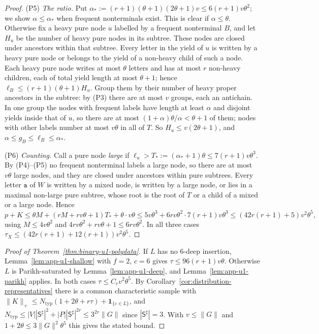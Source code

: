 \documentclass[11pt]{article}
\numberwithin{equation}{section}
\theoremstyle{plain}
\theoremstyle{definition}
\theoremstyle{remark}
\newcommand{\eps}{\varepsilon}
\theoremstyle{plain}
\begin{document}
\begin{proof}
(P5) \emph{The ratio.}  Put $\alpha_*:=(r+1)(\theta+1)(2\theta+1)v\le6(r+1)v\theta^2$;
we show $\alpha\le\alpha_*$ when frequent nonterminals exist.  This is clear if
$\alpha\le\theta$.  Otherwise fix a heavy pure node $u$ labelled by a
frequent nonterminal $B$, and let $H_u$ be the number of heavy pure nodes in
its subtree.  These nodes are closed under ancestors within that subtree.
Every letter in the yield of $u$ is written by a heavy pure node or belongs
to the yield of a non-heavy child of such a node.  Each heavy pure node writes
at most $\theta$ letters and has at most $r$ non-heavy children, each of total
yield length at most $\theta+1$; hence
$\ell_B\le(r+1)(\theta+1)H_u$.  Group them by their number of heavy proper
ancestors in the subtree: by (P3) there are at most $v$ groups, each an
antichain.  In one group the nodes with frequent labels have length at least
$\alpha$ and disjoint yields inside that of $u$, so there are at most
$(1+\alpha)\theta/\alpha<\theta+1$ of them; nodes with other labels number at
most $v\theta$ in all of $T$.  So $H_u\le v(2\theta+1)$, and
$\alpha\le g_B\le\ell_B\le\alpha_*$.

(P6) \emph{Counting.}  Call a pure node \emph{large} if $\ell_u>T_*:=(\alpha_*+1)\theta
\le7(r+1)v\theta^3$.  By (P4)--(P5) no frequent nonterminal labels a large node,
so there are at most $v\theta$ large nodes, and they are closed under ancestors
within pure subtrees.  Every letter $\mathtt a$ of $W$ is written by a mixed node, is
written by a large node, or lies in a maximal non-large pure subtree, whose root
is the root of $T$ or a child of a mixed or a large node.  Hence
\[
 p+K\le\theta M+(rM+rv\theta+1)T_*+\theta\cdot v\theta
 \le5v\theta^3+6rv\theta^2\cdot7(r+1)v\theta^3\le(42r(r+1)+5)v^2\theta^5,
\]
using $M\le4v\theta^2$ and $4rv\theta^2+rv\theta+1\le6rv\theta^2$.  In all three
cases $\tau_X\le(42r(r+1)+12(r+1))v^2\theta^5$.
\end{proof}

\begin{proof}[Proof of Theorem~\ref{thm:binary-u1-polydata}]
If $L$ has no $6$-deep insertion, Lemma~\ref{lem:app-u1-shallow} with $f=2$,
$c=6$ gives $\tau\le96(r+1)v\theta$.  Otherwise $L$ is Parikh-saturated by
Lemma~\ref{lem:app-u1-deep}, and Lemma~\ref{lem:app-u1-parikh} applies.  In both
cases $\tau\le C_rv^2\theta^5$.  By Corollary~\ref{cor:distribution-representatives}
there is a common characteristic sample with
$\|K\|_+\le N_{\mathrm{typ}}(1+2\theta+r\tau)+\mathbf 1_{\{\eps\in L\}}$, and
$N_{\mathrm{typ}}\le|V||\mathsf S^\sharp|^2+|P||\mathsf S^\sharp|^{2r}\le3^{2r}\|G\|$ since
$|\mathsf S^\sharp|=3$.  With $v\le\|G\|$ and $1+2\theta\le3\|G\|^2\theta^5$ this gives
the stated bound.
\end{proof}
\end{document}
